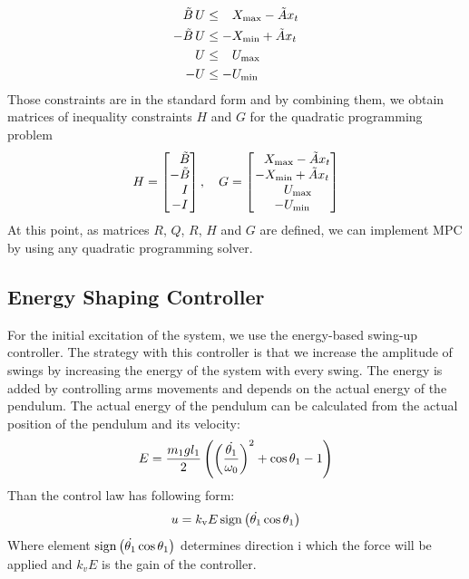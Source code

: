 \begin{subequations}
	\begin{align}
	\tilde{B}\,U &\leq \ \; \,X _{\text{max}} - \tilde{A}x_t\\
	-\tilde{B}\,U &\leq -X _{\text{min}} + \tilde{A}x_t\\
	U &\leq \ \; \,U _{\text{max}}\\
	-U &\leq -U _{\text{min}}
	\end{align}
\end{subequations}
Those constraints are in the standard form and by combining them, we obtain matrices of inequality constraints $H$ and $G$ for the quadratic programming problem
\begin{equation}
	H = \begin{bmatrix}
	\ \; \,\tilde{B}\\
	-\tilde{B}\\
	\ \ \, I\\
	-I\\
	\end{bmatrix}, \quad
	G = \begin{bmatrix}
	\ \; \,X _{\text{max}} - \tilde{A}x_t\\
	-X _{\text{min}} + \tilde{A}x_t\\
	\ \ \:U _{\text{max}}\\
	-U _{\text{min}}
	\end{bmatrix}
\end{equation}
At this point, as matrices $R$, $Q$, $R$, $H$ and $G$ are defined, we can implement MPC by using any quadratic programming solver.
\subsection{Energy Shaping Controller}
For the initial excitation of the system, we use the energy-based swing-up controller. The strategy with this controller is that we increase the amplitude of swings by increasing the energy of the system with every swing. The energy is added by controlling arms movements and depends on the actual energy of the pendulum. The actual energy of the pendulum can be calculated from the actual position of the pendulum and its velocity: 
\begin{equation}
E = \frac{m_1gl_1}{2}\left( \left( \frac{\dot{\theta_1}}{\omega_0} \right)^2+\cos\theta_1 - 1 \right)
\end{equation}
Than the control law has following form:
\begin{equation}
	u = k _{\text{v}}E\,\mathrm{sign}\left( \dot{\theta_1}\cos\theta_1 \right)
\end{equation}
Where element $\mathrm{sign}\left( \dot{\theta_1}\cos\theta_1 \right)$ determines direction i which the force will be applied and $k_vE$ is the gain of the controller.
\newpage
